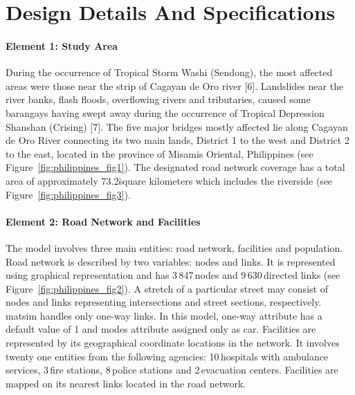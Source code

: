 \section{Design Details And Specifications}
\paragraph{Element 1: Study Area}
During the occurrence of Tropical Storm Washi (Sendong), the most affected areas were those near the strip of Cagayan de Oro river [6]. Landslides near the river banks, flash floods, overflowing rivers and tributaries, caused some barangays having swept away during the occurrence of Tropical Depression Shanshan (Crising) [7]. The five major bridges mostly affected lie along Cagayan de Oro River connecting its two main lands, District 1 to the west and District 2 to the east, located in the province of Misamis Oriental, Philippines (see Figure~\ref{fig:philippines_fig1}). The designated road network coverage has a total area of approximately 73.2\.square kilometers which includes the riverside (see Figure~\ref{fig:philippines_fig3}). 

\paragraph{Element 2: Road Network and Facilities}
The model involves three main entities: road network, facilities and population. Road network is described by two variables: nodes and links. It is represented using graphical representation and has 3\,847\,nodes and 9\,630\,directed links (see Figure~\ref{fig:philippines_fig2}). A stretch of a particular street may consist of nodes and links representing intersections and street sections, respectively. \gls{matsim} handles only one-way links. In this model, one-way attribute has a default value of 1 and modes attribute assigned only as car. Facilities are represented by its geographical coordinate locations in the network. It involves twenty one entities from the following agencies: 10\,hospitals with ambulance services, 3\,fire stations, 8\,police stations and 2\,evacuation centers. Facilities are mapped on its nearest links located in the road network.

